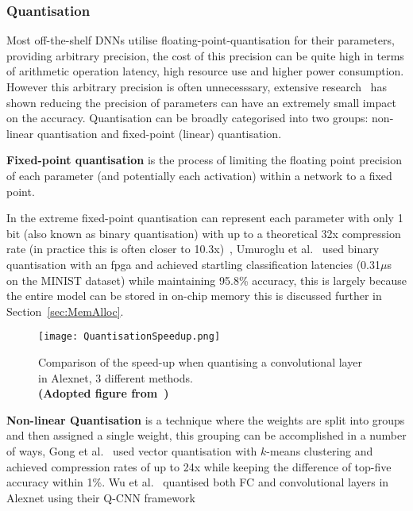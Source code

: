 \documentclass[../../D1.tex]{subfiles}
\begin{document}
\subsubsection{Quantisation}\label{sec:Quantisation}
Most off-the-shelf DNNs utilise floating-point-quantisation for their parameters, providing arbitrary precision, the cost of this precision can be quite high in terms of arithmetic operation latency, high resource use and higher power consumption.
However this arbitrary precision is often unnecesssary, extensive research~\autocite{jacobQuantizationTrainingNeural2018,maOptimizingLoopOperation2017} has shown reducing the precision of parameters can have an extremely small impact on the accuracy.
Quantisation can be broadly categorised into two groups: non-linear quantisation and fixed-point (linear) quantisation. 


\textbf{Fixed-point quantisation} is the process of limiting the floating point precision of each parameter (and potentially each activation) within a network to a fixed point. 

In the extreme fixed-point quantisation can represent each parameter with only 1 bit (also known as binary quantisation) with up to a theoretical 32x compression rate (in practice this is often closer to 10.3x)~\autocite{chenDeepLearningMobile2020}, Umuroglu et al.~\autocite{umurogluFINNFrameworkFast2017} used binary quantisation with an \acrshort{fpga} and achieved startling classification latencies (0.31$\mu$s on the MINIST dataset) while maintaining 95.8\% accuracy, this is largely because the entire model can be stored in on-chip memory this is discussed further in Section~\ref{sec:MemAlloc}.

\begin{figure}[H]
    \begin{center}
        \texttt{[image: QuantisationSpeedup.png]} 
    \end{center}
    
    \caption{Comparison of the speed-up when quantising a convolutional layer in Alexnet, 3 different methods.\\ \textbf{(Adopted figure from~\autocite{wuQuantizedConvolutionalNeural2016})}}
    \label{fig:QuantisationSpeedup}   
\end{figure}

\textbf{Non-linear Quantisation} is a technique where the weights are split into groups and then assigned a single weight, this grouping can be accomplished in a number of ways, Gong et al.~\autocite{gongCompressingDeepConvolutional2014} used vector quantisation with $k$-means clustering and achieved compression rates of up to 24x while keeping the difference of top-five accuracy within 1\%. Wu et al.~\autocite{wuQuantizedConvolutionalNeural2016} quantised both FC and convolutional layers in Alexnet using their Q-CNN framework
\end{document}
